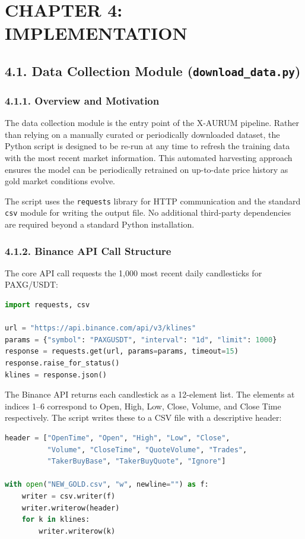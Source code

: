 \section{CHAPTER 4: IMPLEMENTATION}

\subsection{4.1. Data Collection Module (\texttt{download\_data.py})}

\subsubsection{4.1.1. Overview and Motivation}
The data collection module is the entry point of the X-AURUM pipeline. Rather than relying on a manually curated or periodically downloaded dataset, the Python script is designed to be re-run at any time to refresh the training data with the most recent market information. This automated harvesting approach ensures the model can be periodically retrained on up-to-date price history as gold market conditions evolve.

The script uses the \texttt{requests} library for HTTP communication and the standard \texttt{csv} module for writing the output file. No additional third-party dependencies are required beyond a standard Python installation.

\subsubsection{4.1.2. Binance API Call Structure}
The core API call requests the 1,000 most recent daily candlesticks for PAXG/USDT:

\begin{lstlisting}[language=Python]
import requests, csv

url = "https://api.binance.com/api/v3/klines"
params = {"symbol": "PAXGUSDT", "interval": "1d", "limit": 1000}
response = requests.get(url, params=params, timeout=15)
response.raise_for_status()
klines = response.json()
\end{lstlisting}

The Binance API returns each candlestick as a 12-element list. The elements at indices 1--6 correspond to Open, High, Low, Close, Volume, and Close Time respectively. The script writes these to a CSV file with a descriptive header:

\begin{lstlisting}[language=Python]
header = ["OpenTime", "Open", "High", "Low", "Close",
          "Volume", "CloseTime", "QuoteVolume", "Trades",
          "TakerBuyBase", "TakerBuyQuote", "Ignore"]

with open("NEW_GOLD.csv", "w", newline="") as f:
    writer = csv.writer(f)
    writer.writerow(header)
    for k in klines:
        writer.writerow(k)
\end{lstlisting}

